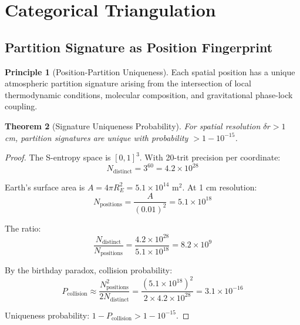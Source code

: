 \documentclass[twocolumn,10pt,a4paper]{article}
\newtheorem{theorem}{Theorem}[section]
\theoremstyle{definition}
\newtheorem{principle}[theorem]{Principle}
\theoremstyle{remark}
\begin{document}
\section{Categorical Triangulation}
\label{sec:triangulation}

\subsection{Partition Signature as Position Fingerprint}

\begin{principle}[Position-Partition Uniqueness]
\label{prin:uniqueness}
Each spatial position has a unique atmospheric partition signature arising from the intersection of local thermodynamic conditions, molecular composition, and gravitational phase-lock coupling.
\end{principle}

\begin{theorem}[Signature Uniqueness Probability]
\label{thm:sig_unique}
For spatial resolution $\delta r > 1$ cm, partition signatures are unique with probability $> 1 - 10^{-15}$.
\end{theorem}

\begin{proof}
The S-entropy space is $[0,1]^3$. With 20-trit precision per coordinate:
\begin{equation}
    N_{\text{distinct}} = 3^{60} = 4.2 \times 10^{28}
\end{equation}

Earth's surface area is $A = 4\pi R_E^2 = 5.1 \times 10^{14}$ m$^2$. At 1 cm resolution:
\begin{equation}
    N_{\text{positions}} = \frac{A}{(0.01)^2} = 5.1 \times 10^{18}
\end{equation}

The ratio:
\begin{equation}
    \frac{N_{\text{distinct}}}{N_{\text{positions}}} = \frac{4.2 \times 10^{28}}{5.1 \times 10^{18}} = 8.2 \times 10^9
\end{equation}

By the birthday paradox, collision probability:
\begin{equation}
    P_{\text{collision}} \approx \frac{N_{\text{positions}}^2}{2 N_{\text{distinct}}} = \frac{(5.1 \times 10^{18})^2}{2 \times 4.2 \times 10^{28}} = 3.1 \times 10^{-16}
\end{equation}

Uniqueness probability: $1 - P_{\text{collision}} > 1 - 10^{-15}$.
\end{proof}
\end{document}
